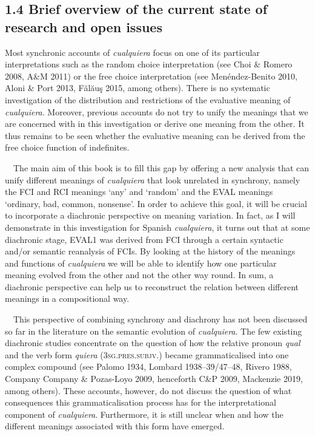 \subsection[1.4 Brief overview of the current state of research and open issues]{1.4 Brief overview of the current state of research and open issues}
\begin{styleStandard}
Most synchronic accounts of \textit{cualquiera} focus on one of its particular interpretations such as the random choice interpretation (see Choi \& Romero 2008, A\&M 2011) or the free choice interpretation (see Menéndez-Benito 2010, Aloni \& Port 2013, Fălăuş 2015, among others). There is no systematic investigation of the distribution and restrictions of the evaluative meaning of \textit{cualquiera}. Moreover, previous accounts do not try to unify the meanings that we are concerned with in this investigation or derive one meaning from the other. It thus remains to be seen whether the evaluative meaning can be derived from the free choice function of indefinites.
\end{styleStandard}

\begin{styleStandard}
\ \ The main aim of this book is to fill this gap by offering a new analysis that can unify different meanings of \textit{cualquiera} that look unrelated in synchrony, namely the FCI and RCI meanings ‘any’ and ‘random’ and the EVAL meanings ‘ordinary, bad, common, nonsense’. In order to achieve this goal, it will be crucial to incorporate a diachronic perspective on meaning variation. In fact, as I will demonstrate in this investigation for Spanish \textit{cualquiera}, it turns out that at some diachronic stage, EVAL1 was derived from FCI through a certain syntactic and/or semantic reanalysis of FCIs. By looking at the history of the meanings and functions of \textit{cualquiera} we will be able to identify how one particular meaning evolved from the other and not the other way round. In sum, a diachronic perspective can help us to reconstruct the relation between different meanings in a compositional way.
\end{styleStandard}

\begin{styleStandard}
\ \ This perspective of combining synchrony and diachrony has not been discussed so far in the literature on the semantic evolution of \textit{cualquiera}. The few existing diachronic studies concentrate on the question of how the relative pronoun \textit{qual} and the verb form \textit{quiera} (3\textsc{sg.pres.subjv.}) became grammaticalised into one complex compound (see Palomo 1934, Lombard 1938–39/47–48, Rivero 1988, Company Company \& Pozas-Loyo 2009, henceforth C\&P 2009, Mackenzie 2019, among others). These accounts, however, do not discuss the question of what consequences this grammaticalisation process has for the interpretational component of \textit{cualquiera}. Furthermore, it is still unclear when and how the different meanings associated with this form have emerged.
\end{styleStandard}


